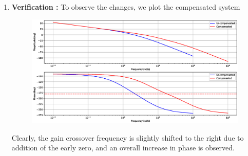 \begin{enumerate}[label=\thesection.\arabic*.,ref=\thesection.\theenumi]
\item
\textbf{Verification : }
To observe the changes, we plot the compensated system

\begin{figure}[!h]
    \centering
    \includegraphics[width=\columnwidth]{./figs/ee18btech11051/ee18btech11051_fig2.eps}
    \label{fig:ee18btech11051_2}
\end{figure}
 Clearly, the gain crossover frequency is slightly shifted to the right due to addition of the early zero, and an overall increase in phase is observed.

\end{enumerate}
